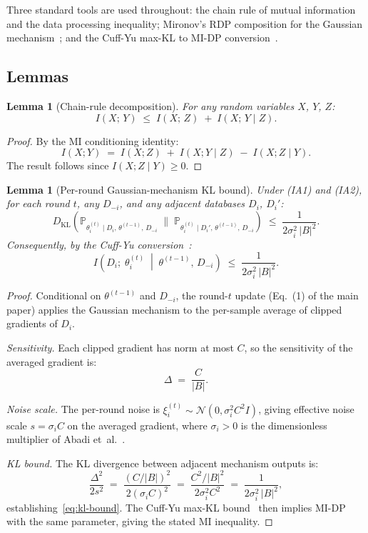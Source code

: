 \documentclass[letterpaper,journal]{IEEEtran}
\newtheorem{lemma}[theorem]{Lemma}
\newcommand{\KL}{D_{\mathrm{KL}}}
\begin{document}
\noindent Three standard tools are used throughout: the chain rule of
mutual information and the data processing inequality;
Mironov's RDP composition for the Gaussian
mechanism~\cite{mironov2017rdp}; and the Cuff-Yu max-KL to
MI-DP conversion~\cite{cuff2016mi}.

\subsection{Lemmas}

\begin{lemma}[Chain-rule decomposition]
\label{lem:chain}
For any random variables $X$, $Y$, $Z$:
\[
I(X;\,Y) \;\leq\; I(X;\,Z) \;+\; I(X;\,Y \mid Z).
\]
\end{lemma}

\begin{proof}
By the MI conditioning identity:
\[
I(X;Y) \;=\; I(X;Z) \;+\; I(X;Y \mid Z) \;-\; I(X;Z \mid Y).
\]
The result follows since $I(X;Z \mid Y) \geq 0$.
\end{proof}

\begin{lemma}[Per-round Gaussian-mechanism KL bound]
\label{lem:perround}
Under (IA1) and (IA2), for each round $t$, any $D_{-i}$, and
any adjacent databases $D_i$, $D_i'$:
\begin{equation}
\KL\!\left(
\mathbb{P}_{\theta_i^{(t)} \mid D_i,\, \theta^{(t-1)},\, D_{-i}}
\;\Big\|\;
\mathbb{P}_{\theta_i^{(t)} \mid D_i',\, \theta^{(t-1)},\,
D_{-i}}\right)
\;\leq\;
\frac{1}{2\sigma_i^2\,|B|^2}.
\label{eq:kl-bound}
\end{equation}
Consequently, by the Cuff-Yu conversion~\cite{cuff2016mi}:
\[
I\!\left(D_i;\;\theta_i^{(t)} \;\middle|\;
\theta^{(t-1)},\,D_{-i}\right)
\;\leq\; \frac{1}{2\sigma_i^2\,|B|^2}.
\]
\end{lemma}

\begin{proof}
Conditional on $\theta^{(t-1)}$ and $D_{-i}$, the round-$t$
update (Eq.~(1) of the main paper) applies the Gaussian
mechanism to the per-sample average of clipped gradients
of $D_i$.

\medskip
\noindent\textit{Sensitivity.} Each clipped gradient has norm
at most $C$, so the sensitivity of the averaged gradient is:
\[
\Delta \;=\; \frac{C}{|B|}.
\]

\noindent\textit{Noise scale.} The per-round noise is
$\xi_i^{(t)} \sim \mathcal{N}(0, \sigma_i^2 C^2 I)$, giving
effective noise scale $s = \sigma_i C$ on the averaged gradient,
where $\sigma_i > 0$ is the dimensionless multiplier of Abadi
et~al.~\cite{abadi2016dpsgd}.

\medskip
\noindent\textit{KL bound.} The KL divergence between adjacent
mechanism outputs is:
\[
\frac{\Delta^2}{2s^2}
\;=\; \frac{(C/|B|)^2}{2(\sigma_i C)^2}
\;=\; \frac{C^2/|B|^2}{2\sigma_i^2 C^2}
\;=\; \frac{1}{2\sigma_i^2\,|B|^2},
\]
establishing~\eqref{eq:kl-bound}. The Cuff-Yu max-KL
bound~\cite{cuff2016mi} then implies MI-DP with the same
parameter, giving the stated MI inequality.
\end{proof}
\end{document}
